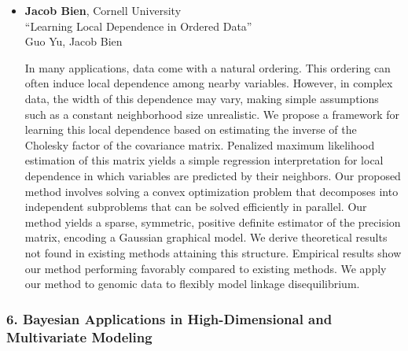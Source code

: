 \begin{itemize}
\item \textbf{Jacob Bien}, Cornell University \\
``Learning Local Dependence in Ordered Data'' \\
Guo Yu, Jacob Bien


In many applications, data come with a natural ordering. This ordering can often induce local dependence among nearby variables. However, in complex data, the width of this dependence may vary, making simple assumptions such as a constant neighborhood size unrealistic. We propose a framework for learning this local dependence based on estimating the inverse of the Cholesky factor of the covariance matrix. Penalized maximum likelihood estimation of this matrix yields a simple regression interpretation for local dependence in which variables are predicted by their neighbors. Our proposed method involves solving a convex optimization problem that decomposes into independent subproblems that can be solved efficiently in parallel. Our method yields a sparse, symmetric, positive definite estimator of the precision matrix, encoding a Gaussian graphical model. We derive theoretical results not found in existing methods attaining this structure.  Empirical results show our method performing favorably compared to existing methods. We apply our method to genomic data to flexibly model linkage disequilibrium.

\end{itemize}

\subsubsection*{6. Bayesian Applications in High-Dimensional and Multivariate Modeling}

